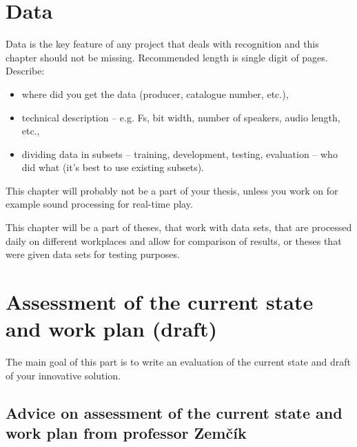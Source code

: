 \section{Data}

Data is the key feature of any project that deals with recognition and this chapter should not be missing. Recommended length is single digit of pages. Describe:
\begin{itemize}
  \item{where did you get the data (producer, catalogue number, etc.),}
  \item{technical description -- e.g. Fs, bit width, number of speakers, audio length, etc.,}
  \item{dividing data in subsets -- training, development, testing, evaluation -- who did what (it's best to use existing subsets).}
\end{itemize}

This chapter will probably not be a part of your thesis, unless you work on for example sound processing for real-time play.

This chapter will be a part of theses, that work with data sets, that are processed daily on different workplaces and allow for comparison of results, or theses that were given data sets for testing purposes.


\section{Assessment of the current state and work plan (draft)}
\label{navrh}

The main goal of this part is to write an evaluation of the current state and draft of your innovative solution.

\subsection{Advice on assessment of the current state and work plan from professor Zemčík}

